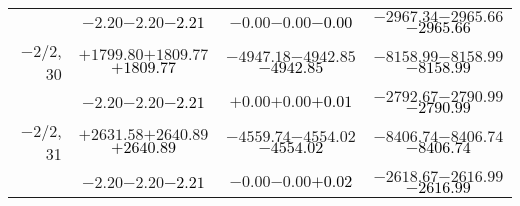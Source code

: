 \documentclass[compress]{beamer}
\begin{document}
\begin{frame}
{\begin{tabular}{r | c | c | c}
           & $-2.20$\hspace{0.1 cm}$-2.20$\hspace{0.1 cm}\textcolor{black}{$-2.21$} & $-0.00$\hspace{0.1 cm}$-0.00$\hspace{0.1 cm}\textcolor{black}{$-0.00$} & $-2967.34$\hspace{0.1 cm}$-2965.66$\hspace{0.1 cm}\textcolor{black}{$-2965.66$} \\
$-$2/2, 30 & $+1799.80$\hspace{0.1 cm}$+1809.77$\hspace{0.1 cm}\textcolor{black}{$+1809.77$} & $-4947.18$\hspace{0.1 cm}$-4942.85$\hspace{0.1 cm}\textcolor{black}{$-4942.85$} & $-8158.99$\hspace{0.1 cm}$-8158.99$\hspace{0.1 cm}\textcolor{black}{$-8158.99$} \\
           & $-2.20$\hspace{0.1 cm}$-2.20$\hspace{0.1 cm}\textcolor{black}{$-2.21$} & $+0.00$\hspace{0.1 cm}$+0.00$\hspace{0.1 cm}\textcolor{black}{$+0.01$} & $-2792.67$\hspace{0.1 cm}$-2790.99$\hspace{0.1 cm}\textcolor{black}{$-2790.99$} \\
$-$2/2, 31 & $+2631.58$\hspace{0.1 cm}$+2640.89$\hspace{0.1 cm}\textcolor{black}{$+2640.89$} & $-4559.74$\hspace{0.1 cm}$-4554.02$\hspace{0.1 cm}\textcolor{black}{$-4554.02$} & $-8406.74$\hspace{0.1 cm}$-8406.74$\hspace{0.1 cm}\textcolor{black}{$-8406.74$} \\
           & $-2.20$\hspace{0.1 cm}$-2.20$\hspace{0.1 cm}\textcolor{black}{$-2.21$} & $-0.00$\hspace{0.1 cm}$-0.00$\hspace{0.1 cm}\textcolor{black}{$+0.02$} & $-2618.67$\hspace{0.1 cm}$-2616.99$\hspace{0.1 cm}\textcolor{black}{$-2616.99$} \\

\end{tabular}}
\end{frame}
\end{document}

